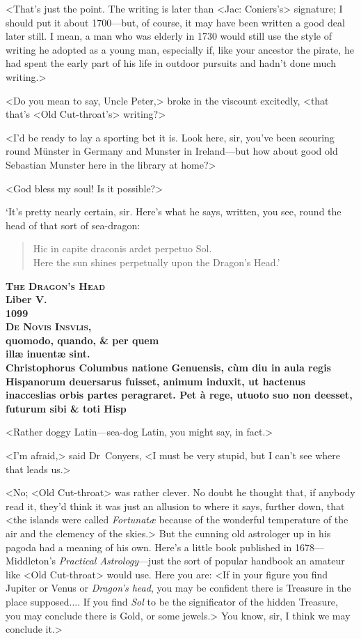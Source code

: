 <That's just the point. The writing is later than <Jac: Coniers's> signature; I should put it about 1700—but, of course, it may have been written a good deal later still. I mean, a man who was elderly in 1730 would still use the style of writing he adopted as a young man, especially if, like your ancestor the pirate, he had spent the early part of his life in outdoor pursuits and hadn't done much writing.>

<Do you mean to say, Uncle Peter,> broke in the viscount excitedly, <that that's <Old Cut-throat's> writing?>

<I'd be ready to lay a sporting bet it is. Look here, sir, you've been scouring round Münster in Germany and Munster in Ireland—but how about good old Sebastian Munster here in the library at home?>

<God bless my soul! Is it possible?>

`It's pretty nearly certain, sir. Here's what he says, written, you see, round the head of that sort of sea-dragon:
\begin{quote}
Hic in capite draconis ardet perpetuo Sol.\\
Here the sun shines perpetually upon the Dragon's Head.'
\end{quote}

\begin{center}\bfseries
\textsc{The Dragon's Head}\\
Liber V\@.\\
1099\\
\textsc{De Novis Insvlis,}\\
quomodo, quando, \& per quem\\
illæ inuentæ sint.\\
Christophorus Columbus natione Genuensis, cùm diu in aula regis Hispanorum deuersarus fuisset, animum induxit, ut hactenus inacceslias orbis partes peragraret. Pet à rege, utuoto suo non deesset, futurum sibi \& toti Hisp
\end{center}

\divider
<Rather doggy Latin—sea-dog Latin, you might say, in fact.>

<I'm afraid,> said Dr~Conyers, <I must be very stupid, but I can't see where that leads us.>

<No; <Old Cut-throat> was rather clever. No doubt he thought that, if anybody read it, they'd think it was just an allusion to where it says, further down, that <the islands were called \textit{Fortunatæ} because of the wonderful temperature of the air and the clemency of the skies.> But the cunning old astrologer up in his pagoda had a meaning of his own. Here's a little book published in 1678—Middleton's \textit{Practical Astrology}—just the sort of popular handbook an amateur like <Old Cut-throat> would use. Here you are: <If in your figure you find Jupiter or Venus or \textit{Dragon's head}, you may be confident there is Treasure in the place supposed.... If you find \textit{Sol} to be the significator of the hidden Treasure, you may conclude there is Gold, or some jewels.> You know, sir, I think we may conclude it.>

